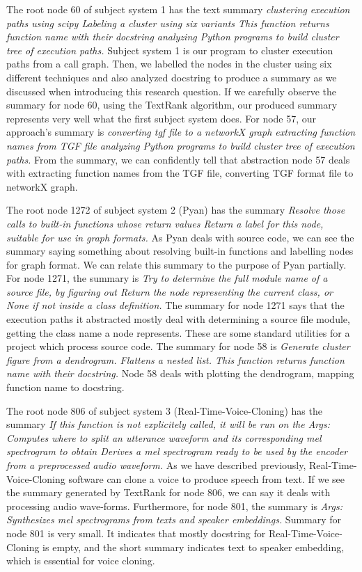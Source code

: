  The root node 60 of subject system 1 has the text summary \textit{clustering execution paths using scipy Labeling a cluster using six variants  This function returns function name with their docstring  analyzing Python programs to build cluster tree of execution paths.} Subject system 1 is our program to cluster execution paths from a call graph. Then, we labelled the nodes in the cluster using six different techniques and also analyzed docstring to produce a summary as we discussed when introducing this research question. If we carefully observe the summary for node 60, using the TextRank algorithm, our produced summary represents very well what the first subject system does. For node 57, our approach's summary is \textit{converting tgf file to a networkX graph extracting function names from TGF file analyzing Python programs to build cluster tree of execution paths.} From the summary, we can confidently tell that abstraction node 57 deals with extracting function names from the TGF file, converting TGF format file to networkX graph.
 
 
The root node 1272 of subject system 2 (Pyan) has the summary \textit{Resolve those calls to built-in functions whose return values Return a label for this node, suitable for use in graph formats.} As Pyan deals with source code, we can see the summary saying something about resolving built-in functions and labelling nodes for graph format. We can relate this summary to the purpose of Pyan partially. For node 1271, the summary is \textit{Try to determine the full module name of a source file, by figuring out       Return the node representing the current class, or None if not inside a class definition.}
The summary for node 1271 says that the execution paths it abstracted mostly deal with determining a source file module, getting the class name a node represents. These are some standard utilities for a project which process source code. The summary for node 58 is \textit{Generate cluster figure from a dendrogram. Flattens a nested list. This function returns function name with their docstring.} Node 58 deals with plotting the dendrogram, mapping function name to docstring.

The root node 806 of subject system 3 (Real-Time-Voice-Cloning) has the summary \textit{If this function is not explicitely called, it will be run on the Args:                  Computes where to split an utterance waveform and its corresponding mel spectrogram to obtain   Derives a mel spectrogram ready to be used by the encoder from a preprocessed audio waveform.} As we have described previously, Real-Time-Voice-Cloning software can clone a voice to produce speech from text. If we see the summary generated by TextRank for node 806, we can say it deals with processing audio wave-forms. Furthermore, for node 801, the summary is \textit{Args:   Synthesizes mel spectrograms from texts and speaker embeddings.} Summary for node 801 is very small. It indicates that mostly docstring for Real-Time-Voice-Cloning is empty, and the short summary indicates text to speaker embedding, which is essential for voice cloning.

